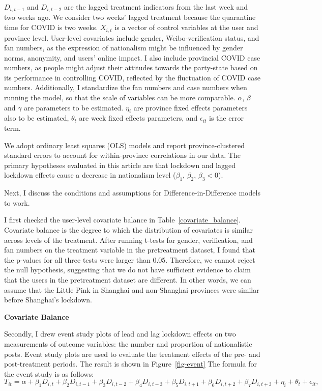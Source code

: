 \documentclass[12pt, ]{article}
\begin{document}
\( D_{i, t-1} \) and \( D_{i, t-2} \) are the lagged treatment indicators from the last week and two weeks ago. We consider two weeks’ lagged treatment because the quarantine time for COVID is two weeks. \( X_{i,t} \) is a vector of control variables at the user and province level. User-level covariates include gender, Weibo-verification status, and fan numbers, as the expression of nationalism might be influenced by gender norms, anonymity, and users’ online impact. I also include provincial COVID case numbers, as people might adjust their attitudes towards the party-state based on its performance in controlling COVID, reflected by the fluctuation of COVID case numbers. Additionally, I standardize the fan numbers and case numbers when running the model, so that the scale of variables can be more comparable. \( \alpha \), \( \beta \) and \( \gamma \) are parameters to be estimated. \( \eta_{i} \) are province fixed effects parameters also to be estimated, \( \theta_{t} \) are week fixed effects parameters, and \( \epsilon_{it} \) is the error term.

We adopt ordinary least squares (OLS) models and report province-clustered standard errors to account for within-province correlations in our data. The primary hypotheses evaluated in this article are that lockdown and lagged lockdown effects cause a decrease in nationalism level (\( \beta_{1} \), \( \beta_{2} \), \( \beta_{3} < 0 \)).

Next, I discuss the conditions and assumptions for Difference-in-Difference models to work.

I first checked the user-level covariate balance in Table~\ref{covariate_balance}. Covariate balance is the degree to which the distribution of covariates is similar across levels of the treatment. After running t-tests for gender, verification, and fan numbers on the treatment variable in the pretreatment dataset, I found that the p-values for all three tests were larger than 0.05. Therefore, we cannot reject the null hypothesis, suggesting that we do not have sufficient evidence to claim that the users in the pretreatment dataset are different. In other words, we can assume that the Little Pink in Shanghai and non-Shanghai provinces were similar before Shanghai’s lockdown.
 
\begin{table}
\caption{\textbf{Covariate Balance}}
\label{covariate_balance}

\end{table}

Secondly, I drew event study plots of lead and lag lockdown effects on two measurements of outcome variables: the number and proportion of nationalistic posts. Event study plots are used to evaluate the treatment effects of the pre- and post-treatment periods. The result is shown in Figure~\ref{fig-event} The formula for the event study is as follows: 
\[ T_{it} = \alpha + \beta_{1}D_{i,t} + \beta_{2}D_{i,t - 1} + \beta_{3}D_{i,t - 2} + \beta_{4}D_{i,t - 3} +\beta_{5}D_{i,t +1}+ \beta_{6}D_{i,t + 2}+\beta_{7}D_{i,t + 3} + \eta_{i} + \theta_{t} + \epsilon_{it}, \]
\end{document}
